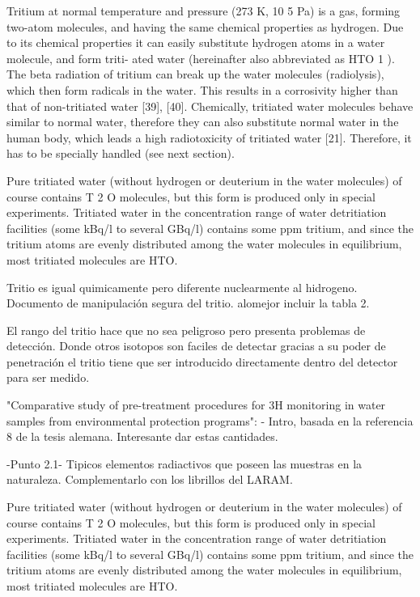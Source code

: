 Tritium at normal temperature and pressure (273 K, 10 5 Pa) is a gas, forming two-atom
molecules, and having the same chemical properties as hydrogen. Due to its chemical
properties it can easily substitute hydrogen atoms in a water molecule, and form triti-
ated water (hereinafter also abbreviated as HTO 1 ). The beta radiation of tritium can
break up the water molecules (radiolysis), which then form radicals in the water. This
results in a corrosivity higher than that of non-tritiated water [39], [40].
Chemically, tritiated water molecules behave similar to normal water, therefore they
can also substitute normal water in the human body, which leads a high radiotoxicity of
tritiated water [21]. Therefore, it has to be specially handled (see next section).

Pure tritiated water (without hydrogen or deuterium in the water molecules) of course contains T 2 O molecules, but this form is produced only in special experiments. Tritiated water in the concentration range of water detritiation facilities (some kBq/l to several GBq/l) contains some ppm tritium, and since the tritium atoms are evenly distributed among the water molecules in equilibrium, most
tritiated molecules are HTO.

Tritio es igual quimicamente pero diferente nuclearmente al hidrogeno. Documento de manipulación segura del tritio. alomejor incluir la tabla 2.

El rango del tritio hace que no sea peligroso pero presenta problemas de detección. Donde otros isotopos son faciles de detectar gracias a su poder de penetración el tritio tiene que ser introducido directamente dentro del detector para ser medido.




"Comparative study of pre-treatment procedures for 3H monitoring in water samples from environmental protection programs":
- Intro, basada en la referencia 8 de la tesis alemana. Interesante dar estas cantidades.

-Punto 2.1- Tipicos elementos radiactivos que poseen las muestras en la naturaleza. Complementarlo con los librillos del LARAM.




Pure tritiated water (without hydrogen or deuterium in the water molecules) of course contains T 2 O molecules, but this form is produced only in special experiments. Tritiated water in the concentration range of water detritiation facilities (some kBq/l to several GBq/l) contains some ppm tritium, and since the tritium atoms are evenly distributed among the water molecules in equilibrium, most tritiated molecules are HTO.

